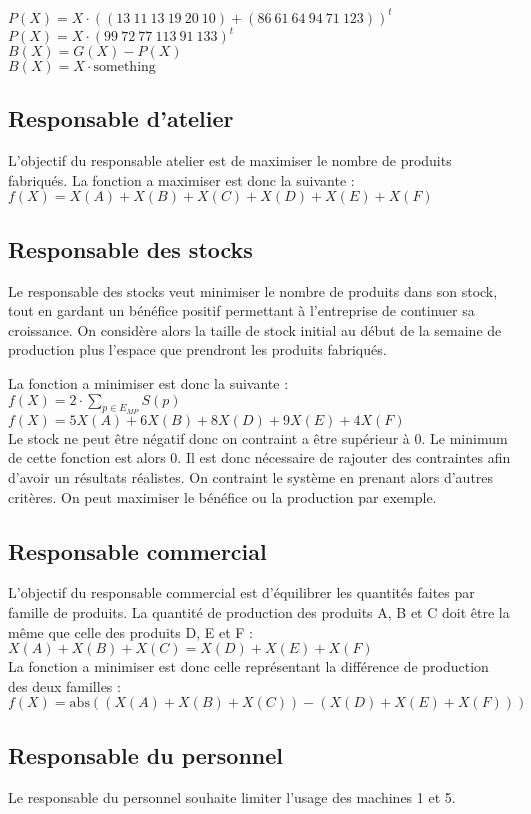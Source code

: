 \documentclass[a4paper, 11pt]{article}
\begin{document}
$P(X) = X\cdot\left((13~11~13~19~20~10) + (86~61~64~94~71~123)\right)^t$ \\
$P(X) = X\cdot(99~72~77~113~91~133)^t$ \\

$B(X) = G(X) - P(X)$ \\
$B(X) = X\cdot\mbox{something}$ \\

\subsection{Responsable d'atelier}
L'objectif du responsable atelier est de maximiser le nombre de produits fabriqués.
La fonction a maximiser est donc la suivante : \\
$ f(X) = X(A) + X(B) + X(C) + X(D) + X(E) + X(F) $

\subsection{Responsable des stocks}
Le responsable des stocks veut minimiser le nombre de produits dans son stock,
tout en gardant un bénéfice positif permettant à l'entreprise de continuer sa croissance.
On considère alors la taille de stock initial au début de la semaine de production
plus l'espace que prendront les produits fabriqués.

La fonction a minimiser est donc la suivante : \\
$f(X) = 2\cdot \sum_{p\in E_{MP}} S(p)$ \\
$f(X) = 5 X(A) + 6 X(B) + 8 X(D) + 9 X(E) + 4 X(F)$ \\

Le stock ne peut être négatif donc on contraint a être supérieur à 0.
Le minimum de cette fonction est alors 0. Il est donc nécessaire de rajouter
des contraintes afin d'avoir un résultats réalistes.
On contraint le système en prenant alors d'autres critères.
On peut maximiser le bénéfice ou la production par exemple.

\subsection{Responsable commercial}
L'objectif du responsable commercial est d'équilibrer les quantités faites par famille de produits.
La quantité de production des produits A, B et C doit être la même que celle des produits D, E et F : \\
$X(A) + X(B) + X(C) = X(D) + X(E) + X(F)$ \\

La fonction a minimiser est donc celle représentant la différence de production des deux familles : \\
$f(X) = \mbox{abs}((X(A) + X(B) + X(C)) - (X(D) + X(E) + X(F))) $

\subsection{Responsable du personnel}
Le responsable du personnel souhaite limiter l'usage des machines 1 et 5.
\end{document}
